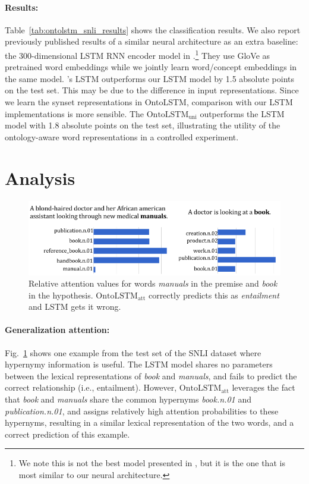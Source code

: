 \paragraph{Results:}
Table~\ref{tab:ontolstm_snli_results} shows the classification results. We also report previously published results of a similar neural architecture as an extra baseline: the 300-dimensional LSTM RNN encoder model in \cite{bowman2016fast}.\footnote{We note this is not the best model presented in \cite{bowman2016fast}, but it is the one that is most similar to our neural architecture.}
They use GloVe as pretrained word embeddings while we jointly learn word/concept embeddings in the same model.
\cite{bowman2016fast}'s LSTM outperforms our LSTM model by 1.5 absolute points on the test set. This may be due to the difference in input representations. Since we learn the synset representations in OntoLSTM, comparison with our LSTM implementations is more sensible.
The $\text{OntoLSTM}_{\text{uni}}$ outperforms the LSTM model with 1.8 absolute points on the test set, illustrating the utility of the ontology-aware word representations in a controlled experiment.

\section{Analysis}
\label{sec:discussion}
\begin{figure}
\begin{center}
\includegraphics[width=5in]{figures/ontolstm_snli_comparison.png}
\caption{Relative attention values for words \textit{manuals} in the premise and \textit{book} in the hypothesis. $\text{OntoLSTM}_{\text{att}}$ correctly predicts this as \textit{entailment} and LSTM gets it wrong. }
\label{fig:snli_visualization}
\end{center}
\end{figure}

\paragraph{Generalization attention:} \label{sec:generalization}
Fig.~\ref{fig:snli_visualization} shows one example from the test set of the SNLI dataset where hypernymy information is useful. 
The LSTM model shares no parameters between the lexical representations of \textit{book} and \textit{manuals}, and fails to predict the correct relationship (i.e., entailment). 
However, $\text{OntoLSTM}_{\text{att}}$ leverages the fact that \textit{book} and \textit{manuals} share the common hypernyms \textit{book.n.01} and \textit{publication.n.01}, and assigns relatively high attention probabilities to these hypernyms, resulting in a similar lexical representation of the two words, and a correct prediction of this example.

